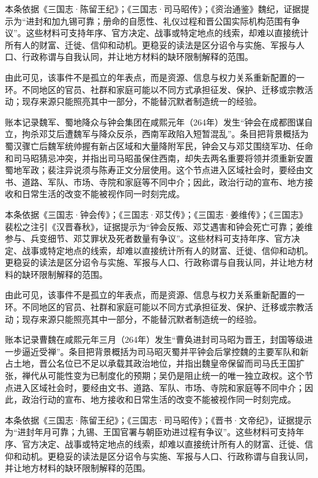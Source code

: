 本条依据《三国志·陈留王纪》；《三国志·司马昭传》；《资治通鉴》魏纪，证据提示为“进封和加九锡可靠；册命的自愿性、礼仪过程和晋公国实际机构范围有争议”。这些材料可支持年序、官方决定、战事或特定地点的线索，却难以直接统计所有人的财富、迁徙、信仰和动机。更稳妥的读法是区分诏令与实施、军报与人口、行政称谓与自我认同，并让地方材料的缺环限制解释的范围。

由此可见，该事件不是孤立的年表点，而是资源、信息与权力关系重新配置的一环。不同地区的官员、社群和家庭可能以不同方式承担征发、保护、迁移或宗教活动；现存来源只能照亮其中一部分，不能替沉默者制造统一的经验。

账本记录魏军、蜀地降众与钟会集团在咸熙元年（264年）发生“钟会在成都图谋自立，拘杀邓艾后遭魏军与降众反杀，西南军政陷入短暂混乱”。条目把背景概括为蜀汉骤亡后魏军统帅握有新占区域和大量降附军民，钟会又与邓艾围绕军功、任命和司马昭猜忌冲突，并指出司马昭虽保住西南，却失去两名重要将领并须重新安置蜀地军政；裴注异说须与陈寿正文分层使用。这个节点进入区域社会时，要经由文书、道路、军队、市场、寺院和家庭等不同中介；因此，政治行动的宣布、地方接收和日常生活的改变不能被视作同一时刻完成。

本条依据《三国志·钟会传》；《三国志·邓艾传》；《三国志·姜维传》；《三国志》裴松之注引《汉晋春秋》，证据提示为“钟会反叛、邓艾遇害和钟会死亡可靠；姜维参与、兵变细节、邓艾罪状及死者数量有争议”。这些材料可支持年序、官方决定、战事或特定地点的线索，却难以直接统计所有人的财富、迁徙、信仰和动机。更稳妥的读法是区分诏令与实施、军报与人口、行政称谓与自我认同，并让地方材料的缺环限制解释的范围。

由此可见，该事件不是孤立的年表点，而是资源、信息与权力关系重新配置的一环。不同地区的官员、社群和家庭可能以不同方式承担征发、保护、迁移或宗教活动；现存来源只能照亮其中一部分，不能替沉默者制造统一的经验。

账本记录曹魏在咸熙元年三月（264年）发生“曹奂进封司马昭为晋王，封国等级进一步逼近受禅”。条目把背景概括为司马昭灭蜀并平钟会后掌控魏的主要军队和新占土地，晋公名位已不足以承载其政治地位，并指出魏皇帝保留而司马氏王国扩张，禅代从可能性变为已制度化的预期；吴仍是阻止统一的唯一独立政权。这个节点进入区域社会时，要经由文书、道路、军队、市场、寺院和家庭等不同中介；因此，政治行动的宣布、地方接收和日常生活的改变不能被视作同一时刻完成。

本条依据《三国志·陈留王纪》；《三国志·司马昭传》；《晋书·文帝纪》，证据提示为“进封年月可靠；九锡、王国官署与朝臣劝进过程有争议”。这些材料可支持年序、官方决定、战事或特定地点的线索，却难以直接统计所有人的财富、迁徙、信仰和动机。更稳妥的读法是区分诏令与实施、军报与人口、行政称谓与自我认同，并让地方材料的缺环限制解释的范围。

